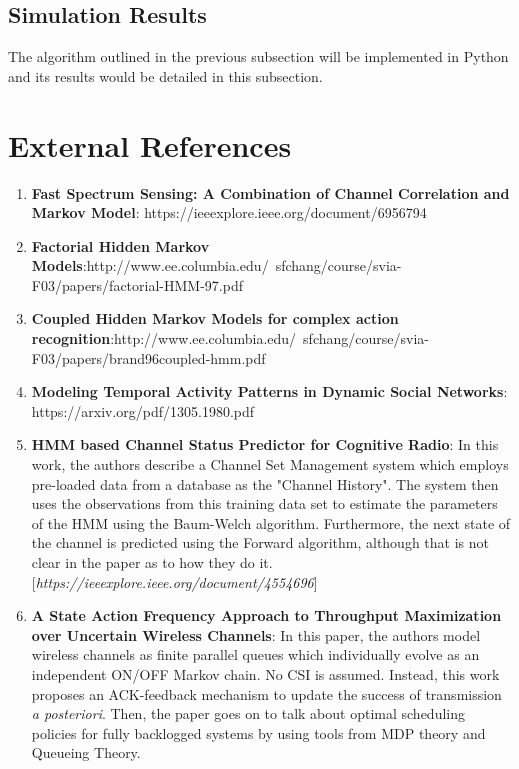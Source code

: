 \documentclass[12pt, draftcls, onecolumn]{IEEEtran}
\begin{document}
\subsection{Simulation Results}
The algorithm outlined in the previous subsection will be implemented in Python and its results would be detailed in this subsection.
\section{External References}
\begin{enumerate}
    \item \textbf{Fast Spectrum Sensing: A Combination of Channel Correlation and Markov Model}: https://ieeexplore.ieee.org/document/6956794
    \item \textbf{Factorial Hidden Markov Models}:\newline http://www.ee.columbia.edu/~sfchang/course/svia-F03/papers/factorial-HMM-97.pdf
    \item \textbf{Coupled Hidden Markov Models for complex action recognition}:\newline http://www.ee.columbia.edu/~sfchang/course/svia-F03/papers/brand96coupled-hmm.pdf
    \item \textbf{Modeling Temporal Activity Patterns in Dynamic Social
    Networks}: \\https://arxiv.org/pdf/1305.1980.pdf
    \item \textbf{HMM based Channel Status Predictor for Cognitive Radio}: In this work, the authors describe a Channel Set Management system which employs pre-loaded data from a database as the "Channel History". The system then uses the observations from this training data set to estimate the parameters of the HMM using the Baum-Welch algorithm. Furthermore, the next state of the channel is predicted using the Forward algorithm, although that is not clear in the paper as to how they do it. [\textit{https://ieeexplore.ieee.org/document/4554696}]
    \item \textbf{A State Action Frequency Approach to Throughput Maximization over Uncertain Wireless Channels}: In this paper, the authors model wireless channels as finite parallel queues which individually evolve as an independent ON/OFF Markov chain. No CSI is assumed. Instead, this work proposes an ACK-feedback mechanism to update the success of transmission \textit{a posteriori}. Then, the paper goes on to talk about optimal scheduling policies for fully backlogged systems by using tools from MDP theory and Queueing Theory.\newline

\end{enumerate}
\end{document}
